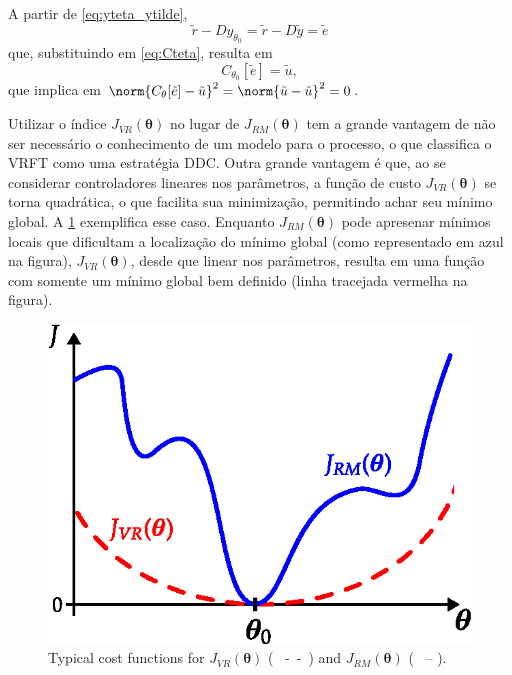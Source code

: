 A partir de \eqref{eq:yteta_ytilde}, 
\begin{equation*}
   \tilde{r}-D y_{\theta_{0}}=\tilde{r}-D \tilde{y}=\tilde{e}
\label{eq:}
\end{equation*}
que, substituindo em \eqref{eq:Cteta}, resulta em
\begin{equation*}
C_{\theta_{0}}[\tilde{e}]=\tilde{u},
\label{eq:}
\end{equation*}
que implica em $\norm{C_\theta[\tilde{e}] - \tilde{u}}^2 = \norm{\tilde{u} - \tilde{u}}^2 = 0$. 


Utilizar o índice $J_{VR}(\bm{\theta})$ no lugar de $J_{RM}(\bm{\theta})$ tem a grande vantagem de não ser necessário o conhecimento de um modelo para o processo, o que classifica o VRFT como uma estratégia DDC. Outra grande vantagem é que, ao se considerar controladores lineares nos parâmetros, a função de custo $J_{VR}(\bm{\theta})$ se torna quadrática, o que facilita sua minimização, permitindo achar seu mínimo global. A \ref{fig:JVR_JRM_plot} exemplifica esse caso. Enquanto $J_{RM}(\bm{\theta})$ pode apresenar mínimos locais que dificultam a localização do mínimo global (como representado em azul na figura), $J_{VR}(\bm{\theta})$, desde que linear nos parâmetros, resulta em uma função com somente um mínimo global bem definido (linha tracejada vermelha na figura).
\begin{figure}[htpb]
   \centering
   \includegraphics{Figs/JVR_JRM_plot.eps}
   \caption{Typical cost functions for $J_{VR}(\bm{\theta})$ (\ {\color{red} -\ -}\ ) and $J_{RM}(\bm{\theta})$ ({\ \color{blue} -- }).}
   \label{fig:JVR_JRM_plot}
\end{figure}

